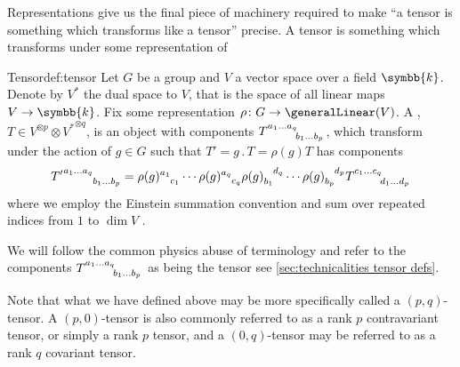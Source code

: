 \documentclass[fleqn]{NotesClass}
\renewcommand{\field}{\symbb{k}}
\newcommand{\action}{\mathbin{.}}
\newcommand{\dual}[1]{{#1^{*}}}
\begin{document}
    Representations give us the final piece of machinery required to make \enquote{a tensor is something which transforms like a tensor} precise.
    A tensor is something which transforms under some representation of 
    \begin{dfn}{Tensor}{def:tensor}
        Let \(G\) be a group and \(V\) a vector space over a field \(\field\).
        Denote by \(\dual{V}\) the dual space to \(V\), that is the space of all linear maps \(V \to \field\).
        Fix some representation \(\rho \colon G \to \generalLinear(V)\).
        A , \(T \in V^{\otimes p} \otimes \dual{V}^{\otimes q}\), is an object with components \(\tensor{T}{^{a_1\dotso a_q}_{b_1 \dotso b_p}}\), which transform under the action of \(g \in G\) such that \(T' = g \action T = \rho(g)T\) has components
        \begin{equation*}
            \tensor{{T'}}{^{a_1\dotso a_q}_{b_1 \dotso b_p}} = \tensor{\rho(g)}{^{a_1}_{c_1}} \dotsm \tensor{\rho(g)}{^{a_q}_{c_q}} \tensor{\rho(g)}{_{b_1}^{d_q}} \dotsm \tensor{\rho(g)}{_{b_p}^{d_p}} \tensor{T}{^{c_1\dotso c_q}_{d_1 \dotso d_p}}
        \end{equation*}
        where we employ the Einstein summation convention and sum over repeated indices from \(1\) to \(\dim V\) \cite[18]{cvitanovic}.
    \end{dfn}
    
    We will follow the common physics abuse of terminology and refer to the components \(\tensor{T}{^{a_1\dotso a_q}_{b_1\dotso b_p}}\) as being the tensor see \cref{sec:technicalities tensor defs}.
    
    Note that what we have defined above may be more specifically called a \((p, q)\)-tensor.
    A \((p, 0)\)-tensor is also commonly referred to as a rank \(p\) contravariant tensor, or simply a rank \(p\) tensor, and a \((0, q)\)-tensor may be referred to as a rank \(q\) covariant tensor.
    
\end{document}
